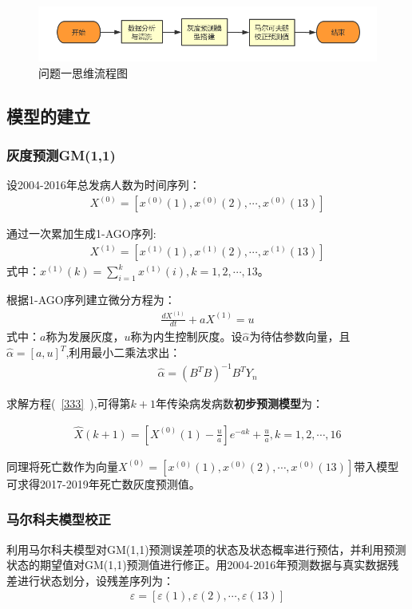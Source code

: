 \documentclass{whutmod}
\begin{document}
       \begin{figure}[H]
   	\centering
   	\includegraphics[width=\textwidth]{figures/lctc.png}
   	\caption{问题一思维流程图}\label{lct}
   \end{figure}

   
	    \subsection{模型的建立}
	    \subsubsection{灰度预测GM(1,1)}
	    设2004-2016年总发病人数为时间序列：
	     \begin{gather*}
	    X^{(0)}=[x^{(0)}(1),x^{(0)}(2),\cdots,x^{(0)}(13)]
	    \end{gather*}
	    
	    通过一次累加生成1-AGO序列:
	    \begin{gather*}
	    X^{(1)}=[x^{(1)}(1),x^{(1)}(2),\cdots,x^{(1)}(13)]
	    \end{gather*}
	    式中：$x^{(1)}(k)=\sum_{i=1}^{k}x^{(1)}(i),k=1,2,\cdots,13$。
	    
	    根据1-AGO序列建立微分方程为\cite{bib:one}：
	     \begin{gather}\label{333}
	    \frac{d X^{(1)}}{dt}+a X^{(1)} = u
	     \end{gather}
	     式中：$a$称为发展灰度，$u$称为内生控制灰度。设$\widehat{\alpha }$为待估参数向量，且$\widehat{\alpha }=[a,u]^T$,利用最小二乘法求出：
	     \begin{gather}
	     \widehat{\alpha }=(B^TB)^{-1}B^{T}Y_{n}
	     \end{gather}

	     
	     求解方程(~\ref{333}~),可得第$k+1$年传染病发病数\textbf{初步预测模型}为：

	     \begin{gather}
	     \widehat{X}(k+1)=[X^{(0)}(1)-\frac{u}{a}]e^{-ak}+\frac{u}{a},k=1,2,\cdots,16
	     \end{gather}
	     
	     同理将死亡数作为向量$X^{(0)}=[x^{(0)}(1),x^{(0)}(2),\cdots,x^{(0)}(13)]$带入模型可求得2017-2019年死亡数灰度预测值。
	     \subsubsection{马尔科夫模型校正}
	     利用马尔科夫模型对GM(1,1)预测误差项的状态及状态概率进行预估，并利用预测状态的期望值对GM(1,1)预测值进行修正\cite{bib:2}。用2004-2016年预测数据与真实数据残差进行状态划分，设残差序列为：
	     \begin{gather*}
	    \varepsilon =[\varepsilon(1) ,\varepsilon(2), \cdots,\varepsilon(13)]
	     \end{gather*}
	     
\end{document}
